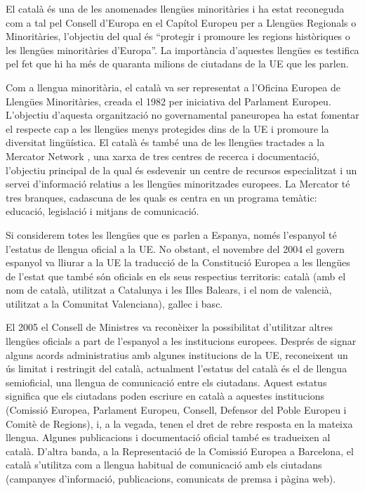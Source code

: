 \documentclass[]{../../metanetpaper}
\begin{document}
\begin{multicols}{2}
El català és una de les anomenades llengües minoritàries i ha estat reconeguda com a tal pel Consell d’Europa en el Capítol Europeu per a Llengües Regionals o Minoritàries, l’objectiu del qual és “protegir i promoure les regions històriques o les llengües minoritàries d’Europa”. La importància d’aquestes llengües es testifica pel fet que hi ha més de quaranta milions de ciutadans de la UE que les parlen.

Com a llengua minoritària, el català va ser representat a l’Oficina Europea de Llengües Minoritàries, creada el 1982 per iniciativa del Parlament Europeu. L’objectiu d’aquesta organització no governamental paneuropea ha estat fomentar el respecte cap a les llengües menys protegides dins de la UE i promoure la diversitat lingüística. El català és també una de les llengües tractades a la Mercator Network \cite{CAT-Nota8}, una xarxa de tres centres de recerca i documentació, l’objectiu principal de la qual és esdevenir un centre de recursos especialitzat i un servei d’informació relatius a les llengües minoritzades europees. La Mercator té tres branques, cadascuna de les quals es centra en un programa temàtic: educació, legislació i mitjans de comunicació.  

Si considerem totes les llengües que es parlen a Espanya, només l’espanyol té l’estatus de llengua oficial a la UE. No obstant, el novembre del 2004 el govern espanyol va lliurar a la UE la traducció de la Constitució Europea a les llengües de l’estat que també són oficials en els seus respectius territoris: català (amb el nom de català, utilitzat a Catalunya i les Illes Balears, i el nom de valencià, utilitzat a la Comunitat Valenciana), gallec i basc.

El 2005 el Consell de Ministres va reconèixer la possibilitat d’utilitzar altres llengües oficials a part de l’espanyol a les institucions europees. Després de signar alguns acords administratius amb algunes institucions de la UE, reconeixent un ús limitat i restringit del català, actualment l’estatus del català és el de llengua semioficial, una llengua de comunicació entre els ciutadans. Aquest estatus significa que els ciutadans poden escriure en català a aquestes institucions (Comissió Europea, Parlament Europeu, Consell, Defensor del Poble Europeu i Comitè de Regions), i, a la vegada, tenen el dret de rebre resposta en la mateixa llengua. Algunes publicacions i documentació oficial també es tradueixen al català. D’altra banda, a la Representació de la Comissió Europea a Barcelona, el català s’utilitza com a llengua habitual de comunicació amb els ciutadans (campanyes d’informació, publicacions, comunicats de premsa i pàgina web). 


\end{multicols}
\end{document}
